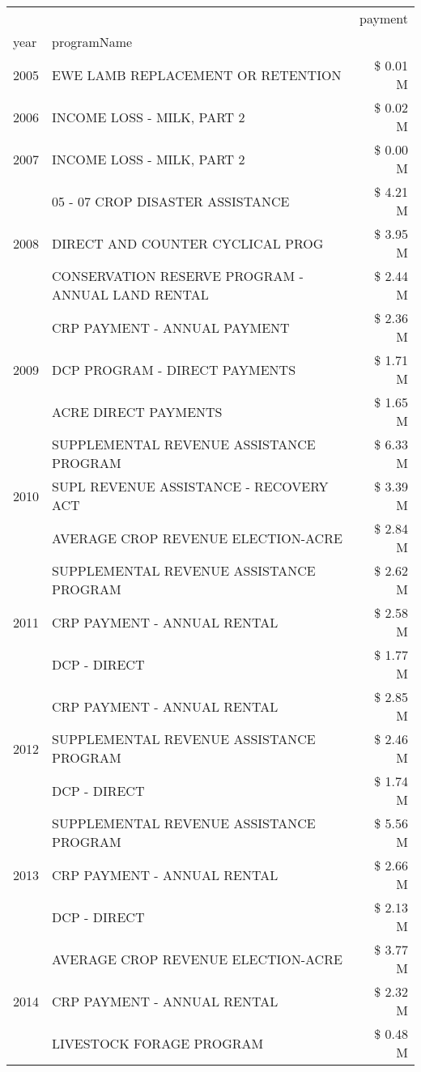 \begin{tabular}{llr}
\toprule
 &  & payment \\
year & programName &  \\
\midrule
2005 & EWE LAMB REPLACEMENT OR RETENTION & \$ 0.01 M \\
\cline{1-3}
2006 & INCOME LOSS - MILK, PART 2 & \$ 0.02 M \\
\cline{1-3}
2007 & INCOME LOSS - MILK, PART 2 & \$ 0.00 M \\
\cline{1-3}
\multirow[t]{3}{*}{2008} & 05 - 07 CROP DISASTER ASSISTANCE & \$ 4.21 M \\
 & DIRECT AND COUNTER CYCLICAL PROG & \$ 3.95 M \\
 & CONSERVATION RESERVE PROGRAM - ANNUAL LAND RENTAL & \$ 2.44 M \\
\cline{1-3}
\multirow[t]{3}{*}{2009} & CRP PAYMENT - ANNUAL PAYMENT & \$ 2.36 M \\
 & DCP PROGRAM - DIRECT PAYMENTS & \$ 1.71 M \\
 & ACRE DIRECT PAYMENTS & \$ 1.65 M \\
\cline{1-3}
\multirow[t]{3}{*}{2010} & SUPPLEMENTAL REVENUE ASSISTANCE PROGRAM & \$ 6.33 M \\
 & SUPL REVENUE ASSISTANCE - RECOVERY ACT & \$ 3.39 M \\
 & AVERAGE CROP REVENUE ELECTION-ACRE & \$ 2.84 M \\
\cline{1-3}
\multirow[t]{3}{*}{2011} & SUPPLEMENTAL REVENUE ASSISTANCE PROGRAM & \$ 2.62 M \\
 & CRP PAYMENT - ANNUAL RENTAL & \$ 2.58 M \\
 & DCP - DIRECT & \$ 1.77 M \\
\cline{1-3}
\multirow[t]{3}{*}{2012} & CRP PAYMENT - ANNUAL RENTAL & \$ 2.85 M \\
 & SUPPLEMENTAL REVENUE ASSISTANCE PROGRAM & \$ 2.46 M \\
 & DCP - DIRECT & \$ 1.74 M \\
\cline{1-3}
\multirow[t]{3}{*}{2013} & SUPPLEMENTAL REVENUE ASSISTANCE PROGRAM & \$ 5.56 M \\
 & CRP PAYMENT - ANNUAL RENTAL & \$ 2.66 M \\
 & DCP - DIRECT & \$ 2.13 M \\
\cline{1-3}
\multirow[t]{3}{*}{2014} & AVERAGE CROP REVENUE ELECTION-ACRE & \$ 3.77 M \\
 & CRP PAYMENT - ANNUAL RENTAL & \$ 2.32 M \\
 & LIVESTOCK FORAGE PROGRAM & \$ 0.48 M \\

\end{tabular}
